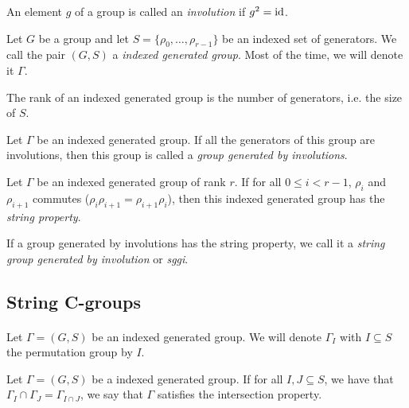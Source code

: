 \begin{definition}[Involution]
  An element $g$ of a group is called an \textit{involution} if $g^2 = \operatorname{id}$.
\end{definition}

\begin{definition}
  Let $G$ be a group and let $S = \{\rho_0, \dots, \rho_{r-1}\}$ be an indexed set of generators.
  We call the pair $(G,S)$ a \textit{indexed generated group}. Most of the time, we will denote it $\Gamma$.
\end{definition}

\begin{definition}
  The rank of an indexed generated group is the number of generators, i.e. the size of $S$.
\end{definition}

\begin{definition}
  Let $\Gamma$ be an indexed generated group. If all the generators of this group are involutions, then this group is called a \textit{group generated by involutions}.
\end{definition}

\begin{definition}
  Let $\Gamma$ be an indexed generated group of rank $r$. If for all $0 \le i < r-1$, $\rho_i$ and $\rho_{i+1}$ commutes ($\rho_i \rho_{i+1} = \rho_{i+1}\rho_i$), then this indexed generated group has the \textit{string property}.
\end{definition}

\begin{definition}
  If a group generated by involutions has the string property, we call it a \textit{string group generated by involution} or \textit{sggi}.
\end{definition}

\subsection{String C-groups}

\paragraph{}
Let $\Gamma = (G,S)$ be an indexed generated group. We will denote $\Gamma_I$ with $I \subseteq S$ the permutation group by $I$.

\begin{definition}
  Let $\Gamma = (G,S)$ be a indexed generated group. If for all $I, J \subseteq S$, we have that $\Gamma_I \cap \Gamma_J = \Gamma_{I \cap J}$, we say that $\Gamma$ satisfies the intersection property.
\end{definition}

